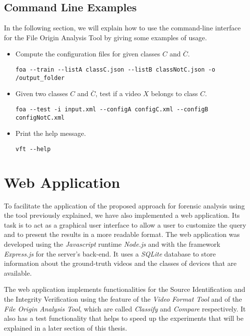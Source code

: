 \subsection{Command Line Examples}


In the following section, we will explain how to use the command-line interface for the File Origin Analysis Tool by giving some examples of usage.

\begin{itemize}

\item Compute the configuration files for given classes $C$ and $\overline{C}$.
\begin{lstlisting}
foa --train --listA classC.json --listB classNotC.json -o /output_folder
\end{lstlisting}

\item Given two classes $C$ and $\overline{C}$, test if a video $X$ belongs to class $C$.
\begin{lstlisting}
foa --test -i input.xml --configA configC.xml --configB configNotC.xml
\end{lstlisting}

\item Print the help message.
\begin{lstlisting}
vft --help
\end{lstlisting}

\end{itemize}

\section{Web Application}

To facilitate the application of the proposed approach for forensic analysis using the tool previously explained, we have also implemented a web application. Its task is to act as a graphical user interface to allow a user to customize the query and to present the results in a more readable format. The web application was developed using the \emph{Javascript} runtime \emph{Node.js} \cite{node} and with the framework \emph{Express.js} \cite{express} for the server's back-end. It uses a \emph{SQLite} database to store information about the ground-truth videos and the classes of devices that are available.

The web application implements functionalities for the Source Identification and the Integrity Verification using the feature of the \emph{Video Format Tool} and of the \emph{File Origin Analysis Tool}, which are called \emph{Classify} and \emph{Compare} respectively.
It also has a test functionality that helps to speed up the experiments that will be explained in a later section of this thesis.

